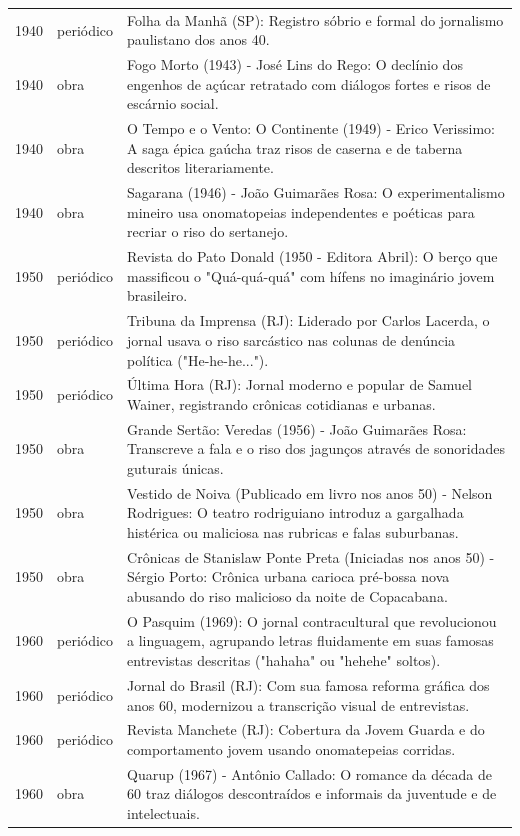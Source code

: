 \begin{longtable}{p{}p{}p{}}
1940 & periódico & Folha da Manhã (SP): Registro sóbrio e formal do jornalismo paulistano dos anos 40. \\
1940 & obra & Fogo Morto (1943) - José Lins do Rego: O declínio dos engenhos de açúcar retratado com diálogos fortes e risos de escárnio social. \\
1940 & obra & O Tempo e o Vento: O Continente (1949) - Erico Verissimo: A saga épica gaúcha traz risos de caserna e de taberna descritos literariamente. \\
1940 & obra & Sagarana (1946) - João Guimarães Rosa: O experimentalismo mineiro usa onomatopeias independentes e poéticas para recriar o riso do sertanejo. \\
1950 & periódico & Revista do Pato Donald (1950 - Editora Abril): O berço que massificou o "Quá-quá-quá" com hífens no imaginário jovem brasileiro. \\
1950 & periódico & Tribuna da Imprensa (RJ): Liderado por Carlos Lacerda, o jornal usava o riso sarcástico nas colunas de denúncia política ("He-he-he..."). \\
1950 & periódico & Última Hora (RJ): Jornal moderno e popular de Samuel Wainer, registrando crônicas cotidianas e urbanas. \\
1950 & obra & Grande Sertão: Veredas (1956) - João Guimarães Rosa: Transcreve a fala e o riso dos jagunços através de sonoridades guturais únicas. \\
1950 & obra & Vestido de Noiva (Publicado em livro nos anos 50) - Nelson Rodrigues: O teatro rodriguiano introduz a gargalhada histérica ou maliciosa nas rubricas e falas suburbanas. \\
1950 & obra & Crônicas de Stanislaw Ponte Preta (Iniciadas nos anos 50) - Sérgio Porto: Crônica urbana carioca pré-bossa nova abusando do riso malicioso da noite de Copacabana. \\
1960 & periódico & O Pasquim (1969): O jornal contracultural que revolucionou a linguagem, agrupando letras fluidamente em suas famosas entrevistas descritas ("hahaha" ou "hehehe" soltos). \\
1960 & periódico & Jornal do Brasil (RJ): Com sua famosa reforma gráfica dos anos 60, modernizou a transcrição visual de entrevistas. \\
1960 & periódico & Revista Manchete (RJ): Cobertura da Jovem Guarda e do comportamento jovem usando onomatepeias corridas. \\
1960 & obra & Quarup (1967) - Antônio Callado: O romance da década de 60 traz diálogos descontraídos e informais da juventude e de intelectuais. \\

\end{longtable}

